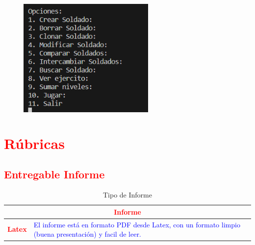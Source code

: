 \documentclass{article}
\begin{document}
	\begin{figure}[H]
		\centering
	\includegraphics[width=0.6\textwidth,keepaspectratio]{img/menu3.png}
	\end{figure}
	
	
	\section{\textcolor{red}{Rúbricas}}
	
	\subsection{\textcolor{red}{Entregable Informe}}
	\begin{table}[H]
		\caption{Tipo de Informe}
		\setlength{\tabcolsep}{0.5em} %
		{\renewcommand{\arraystretch}{1.5}%
		\begin{tabular}{|p{3cm}|p{12cm}|}
			\hline
			\multicolumn{2}{|c|}{\textbf{\textcolor{red}{Informe}}}  \\
			\hline 
			\textbf{\textcolor{red}{Latex}} & \textcolor{blue}{El informe está en formato PDF desde Latex,  con un formato limpio (buena presentación) y facil de leer.}   \\ 
			\hline 
			
			
		\end{tabular}
	}
	\end{table}
	
	\clearpage
	
\end{document}
